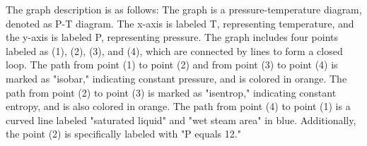 The graph description is as follows: The graph is a pressure-temperature diagram, denoted as P-T diagram. The x-axis is labeled T, representing temperature, and the y-axis is labeled P, representing pressure. The graph includes four points labeled as (1), (2), (3), and (4), which are connected by lines to form a closed loop. The path from point (1) to point (2) and from point (3) to point (4) is marked as "isobar," indicating constant pressure, and is colored in orange. The path from point (2) to point (3) is marked as "isentrop," indicating constant entropy, and is also colored in orange. The path from point (4) to point (1) is a curved line labeled "saturated liquid" and "wet steam area" in blue. Additionally, the point (2) is specifically labeled with "P equals 12."